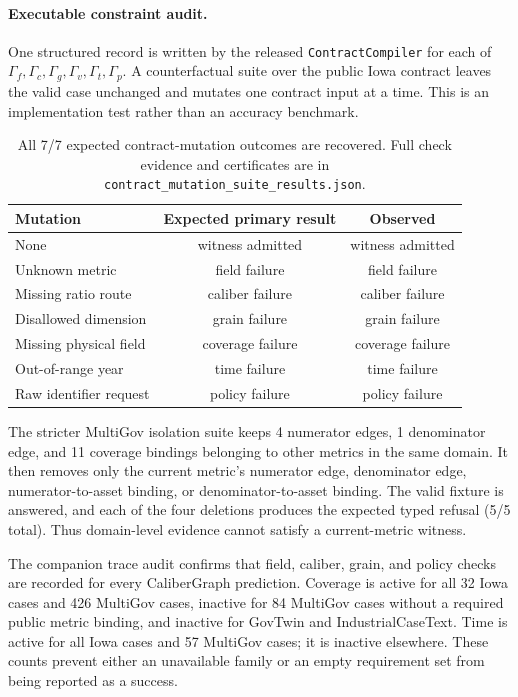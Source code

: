 \documentclass[letterpaper]{article}
\begin{document}
\paragraph{Executable constraint audit.}
One structured record is written by the released \texttt{ContractCompiler} for each of $\Gamma_f,\Gamma_c,\Gamma_g,\Gamma_v,\Gamma_t,\Gamma_p$. A counterfactual suite over the public Iowa contract leaves the valid case unchanged and mutates one contract input at a time. This is an implementation test rather than an accuracy benchmark.

\begin{table}[h]
\centering
\scriptsize
\begin{tabular}{lcc}
\toprule
Mutation & Expected primary result & Observed \\
\midrule
None & witness admitted & witness admitted \\
Unknown metric & field failure & field failure \\
Missing ratio route & caliber failure & caliber failure \\
Disallowed dimension & grain failure & grain failure \\
Missing physical field & coverage failure & coverage failure \\
Out-of-range year & time failure & time failure \\
Raw identifier request & policy failure & policy failure \\
\bottomrule
\end{tabular}
\caption{All 7/7 expected contract-mutation outcomes are recovered. Full check evidence and certificates are in \texttt{contract\_mutation\_suite\_results.json}.}
\end{table}

The stricter MultiGov isolation suite keeps 4 numerator edges, 1 denominator edge, and 11 coverage bindings belonging to other metrics in the same domain. It then removes only the current metric's numerator edge, denominator edge, numerator-to-asset binding, or denominator-to-asset binding. The valid fixture is answered, and each of the four deletions produces the expected typed refusal (5/5 total). Thus domain-level evidence cannot satisfy a current-metric witness.

The companion trace audit confirms that field, caliber, grain, and policy checks are recorded for every CaliberGraph prediction. Coverage is active for all 32 Iowa cases and 426 MultiGov cases, inactive for 84 MultiGov cases without a required public metric binding, and inactive for GovTwin and IndustrialCaseText. Time is active for all Iowa cases and 57 MultiGov cases; it is inactive elsewhere. These counts prevent either an unavailable family or an empty requirement set from being reported as a success.
\end{document}
